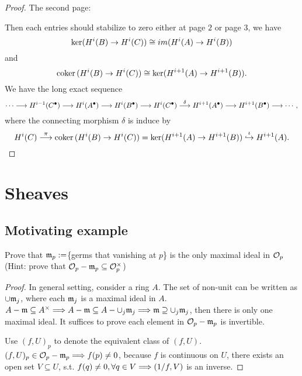 \documentclass[11pt,fleqn]{book} %
\begin{document}
\begin{proof}
The second page:
\begin{center}
\end{center}
Then each entries should stabilize to zero either at page $2$ or page $3$, we have
$$
\ker(H^{i}(B)\rightarrow H^{i}(C))\cong im(H^{i}(A)\rightarrow H^{i}(B))
$$
and
$$
\text{coker\,}(H^{i}(B)\rightarrow H^{i}(C))\cong \ker (H^{i+1}(A)\rightarrow H^{i+1}(B)).
$$
We have the long exact sequence
$$
\cdots\longrightarrow H^{i-1}(C^{\bullet})\longrightarrow H^{i}(A^\bullet)\longrightarrow H^{i}(B^\bullet)\longrightarrow  H^{i}(C^\bullet)\overset{\delta}{\longrightarrow} H^{i+1}(A^\bullet)\longrightarrow H^{i+1}(B^\bullet)\longrightarrow \cdots,
$$
where the connecting morphism $\delta$ is induce by 
$$
H^{i}(C)\overset{\pi}{\longrightarrow}
\text{coker\,}(H^{i}(B)\rightarrow H^{i}(C))= \ker (H^{i+1}(A)\rightarrow H^{i+1}(B))\overset{\iota}{\hookrightarrow} H^{i+1}(A).
$$

\end{proof}




\chapter{Sheaves}
\section{Motivating example}
\begin{exr}
Prove that ${\mathfrak m}_p:=$\{germs that vanishing at $p$\} is the only maximal ideal in ${\cal O}_p$(Hint: prove that ${\cal O}_p-{\mathfrak m}_p\subseteq {\cal O}_p^{\times}$)
\end{exr}
\begin{proof}In general setting, consider a ring $A$.
The set of non-unit can be written as $\cup{\mathfrak m}_j$, where each ${\mathfrak m}_j$ is a maximal ideal in $A$. $A-{\mathfrak m}\subseteq A^\times\Longrightarrow A-{\mathfrak m}\subseteq A-\cup_j{\mathfrak m}_j\Longrightarrow {\mathfrak m}\supseteq\cup_j{\mathfrak m}_j$, then there is only one maximal ideal. It suffices to prove each element in ${\cal O}_p-{\mathfrak m}_p$ is invertible. 

Use $(f,U)_p$ to denote the equivalent class of $(f,U)$.
$(f,U)_p\in {\cal O}_p-{\mathfrak m}_p\Longrightarrow f(p)\neq 0$, because $f$ is continuous on $U$, there exists an open set $V\subseteq U$, s.t. $f(q)\neq0,\forall q\in V\Longrightarrow (1/f,V)$ is an inverse.
\end{proof}
\end{document}
